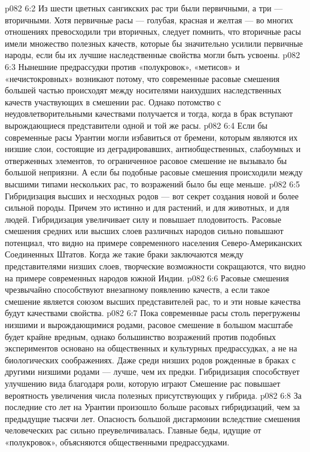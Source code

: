 \vs p082 6:2 Из шести цветных сангикских рас три были первичными, а три --- вторичными. Хотя первичные расы --- голубая, красная и желтая --- во многих отношениях превосходили три вторичных, следует помнить, что вторичные расы имели множество полезных качеств, которые бы значительно усилили первичные народы, если бы их лучшие наследственные свойства могли быть усвоены.
\vs p082 6:3 Нынешние предрассудки против «полукровок», «метисов» и «нечистокровных» возникают потому, что современные расовые смешения большей частью происходят между носителями наихудших наследственных качеств участвующих в смешении рас. Однако потомство с неудовлетворительными качествами получается и тогда, когда в брак вступают вырождающиеся представители одной и той же расы.
\vs p082 6:4 Если бы современные расы Урантии могли избавиться от бремени, которым являются их низшие слои, состоящие из деградировавших, антиобщественных, слабоумных и отверженных элементов, то ограниченное расовое смешение не вызывало бы большой неприязни. А если бы подобные расовые смешения происходили между высшими типами нескольких рас, то возражений было бы еще меньше.
\vs p082 6:5 Гибридизация высших и несходных родов --- вот секрет создания новой и более сильной породы. Причем это истинно и для растений, и для животных, и для людей. Гибридизация увеличивает силу и повышает плодовитость. Расовые смешения средних или высших слоев различных народов сильно повышают  потенциал, что видно на примере современного населения Северо\hyp{}Американских Соединенных Штатов. Когда же такие браки заключаются между представителями низших слоев, творческие возможности сокращаются, что видно на примере современных народов южной Индии.
\vs p082 6:6 Расовые смешения чрезвычайно способствуют внезапному появлению  качеств, а если такое смешение является союзом высших представителей рас, то и эти новые качества будут качествами  свойства.
\vs p082 6:7 Пока современные расы столь перегружены низшими и вырождающимися родами, расовое смешение в большом масштабе будет крайне вредным, однако большинство возражений против подобных экспериментов основано на общественных и культурных предрассудках, а не на биологических соображениях. Даже среди низших родов рожденные в браках с другими низшими родами --- лучше, чем их предки. Гибридизация способствует улучшению вида благодаря роли, которую играют  Смешение рас повышает вероятность увеличения числа полезных  присутствующих у гибрида.
\vs p082 6:8 \pc За последние сто лет на Урантии произошло больше расовых гибридизаций, чем за предыдущие тысячи лет. Опасность большой дисгармонии вследствие смешения человеческих рас сильно преувеличивалась. Главные беды, идущие от «полукровок», объясняются общественными предрассудками.
